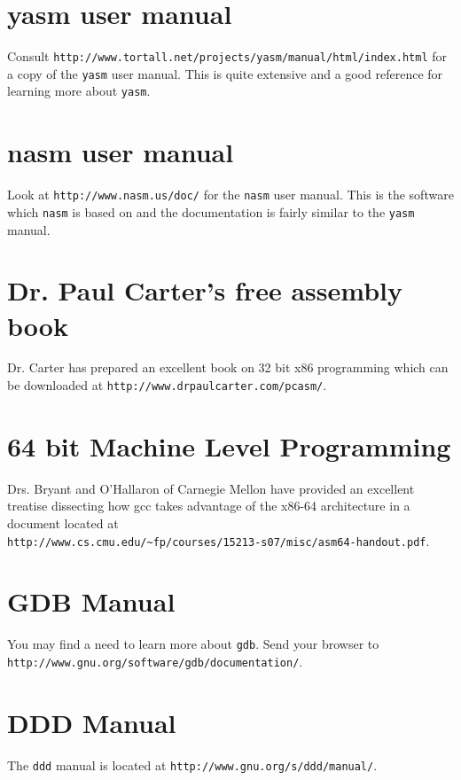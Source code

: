 \documentclass[11pt,b5paper]{book}
\begin{document}
\section{yasm user manual}

Consult {\tt http://www.tortall.net/projects/yasm/manual/html/index.html}
for a copy of the {\tt yasm} user manual.
This is quite extensive and a good reference for learning more about
{\tt yasm}.

\section{nasm user manual}

Look at {\tt http://www.nasm.us/doc/} for the {\tt nasm} user manual.
This is the software which {\tt nasm} is based on and the documentation
is fairly similar to the {\tt yasm} manual.

\section{Dr. Paul Carter's free assembly book}

Dr. Carter has prepared an excellent book on 32 bit x86 programming which
can be downloaded at {\tt http://www.drpaulcarter.com/pcasm/}.

\section{64 bit Machine Level Programming}

Drs. Bryant and O'Hallaron of Carnegie Mellon have provided an excellent
treatise dissecting how gcc takes advantage of the x86-64 architecture
in a document located at\\
{\tt http://www.cs.cmu.edu/\~{}fp/courses/15213-s07/misc/asm64-handout.pdf}.

\section{GDB Manual}

You may find a need to learn more about {\tt gdb}.
Send your browser to 
{\tt http://www.gnu.org/software/gdb/documentation/}.

\section{DDD Manual}
The {\tt ddd} manual is located at
{\tt http://www.gnu.org/s/ddd/manual/}.
\end{document}
